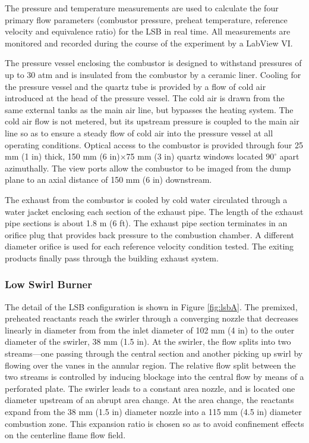 The pressure and temperature measurements are used to calculate the four primary flow parameters (combustor pressure, preheat temperature, reference velocity and equivalence ratio) for the LSB in real time.
All measurements are monitored and recorded during the course of the experiment by a LabView VI.

The pressure vessel enclosing the combustor is designed to withstand pressures of up to 30 atm and is insulated from the combustor by a ceramic liner.
Cooling for the pressure vessel and the quartz tube is provided by a flow of cold air introduced at the head of the pressure vessel.
The cold air is drawn from the same external tanks as the main air line, but bypasses the heating system.
The cold air flow is not metered, but its upstream pressure is coupled to the main air line so as to ensure a steady flow of cold air into the pressure vessel at all operating conditions.
Optical access to the combustor is provided through four 25 mm (1 in) thick, 150 mm (6 in)\(\times\)75 mm (3 in) quartz windows located \(90^\circ\) apart azimuthally.
The view ports allow the combustor to be imaged from the dump plane to an axial distance of 150 mm (6 in) downstream.

The exhaust from the combustor is cooled by cold water circulated through a water jacket enclosing each section of the exhaust pipe.
The length of the exhaust pipe sections is about 1.8 m (6 ft).
The exhaust pipe section terminates in an orifice plug that provides back pressure to the combustion chamber.
A different diameter orifice is used for each reference velocity condition tested.
The exiting products finally pass through the building exhaust system.

\subsubsection{Low Swirl Burner}
\label{subsubsec:configuration-a-low-swirl-burner}



The detail of the LSB configuration is shown in Figure \ref{fig:lsbA}.
The premixed, preheated reactants reach the swirler through a converging nozzle that decreases linearly in diameter from from the inlet diameter of 102 mm (4 in) to the outer diameter of the swirler, 38 mm (1.5 in).
At the swirler, the flow splits into two streams---one passing through the central section and another picking up swirl by flowing over the vanes in the annular region.
The relative flow split between the two streams is controlled by inducing blockage into the central flow by means of a perforated plate.
The swirler leads to a constant area nozzle, and is located one diameter upstream of an abrupt area change.
At the area change, the reactants expand from the 38 mm (1.5 in) diameter nozzle into a 115 mm (4.5 in) diameter combustion zone.
This expansion ratio is chosen so as to avoid confinement effects on the centerline flame flow field.\cite{1998-yegian}

